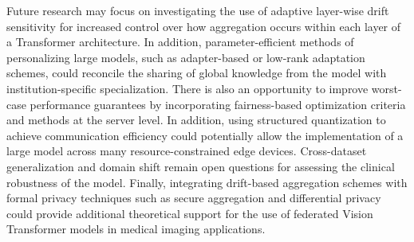 \documentclass{ieeeaccess}
\begin{document}
Future research may focus on investigating the use of adaptive layer-wise drift sensitivity for increased control over how aggregation occurs within each layer of a Transformer architecture. In addition, parameter-efficient methods of personalizing large models, such as adapter-based or low-rank adaptation schemes, could reconcile the sharing of global knowledge from the model with institution-specific specialization. There is also an opportunity to improve worst-case performance guarantees by incorporating fairness-based optimization criteria and methods at the server level. In addition, using structured quantization to achieve communication efficiency could potentially allow the implementation of a large model across many resource-constrained edge devices. Cross-dataset generalization and domain shift remain open questions for assessing the clinical robustness of the model. Finally, integrating drift-based aggregation schemes with formal privacy techniques such as secure aggregation and differential privacy could provide additional theoretical support for the use of federated Vision Transformer models in medical imaging applications.
\end{document}
